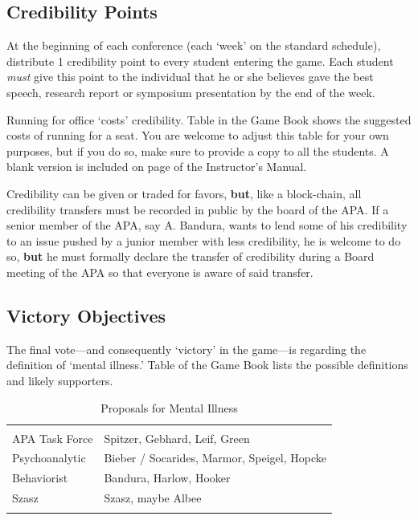 \begin{refsection}
\begin{itemize}
\end{itemize}

\subsection{Credibility Points}
\label{credibilitypoints}

At the beginning of each conference (each ‘week’ on the standard schedule), distribute 1 credibility point to every student entering the game. Each student \emph{must} give this point to the individual that he or she believes gave the best speech, research report or symposium presentation by the end of the week. 

Running for office ‘costs’ credibility. Table  in the Game Book shows the suggested costs of running for a seat. You are welcome to adjust this table for your own purposes, but if you do so, make sure to provide a copy to all the students. A blank version is included on page \pageref{sample: credibilitypointsmenu} of the Instructor's Manual.

Credibility can be given or traded for favors, \textbf{but}, like a block-chain, all credibility transfers must be recorded in public by the board of the APA. If a senior member of the APA, say A. Bandura, wants to lend some of his credibility to an issue pushed by a junior member with less credibility, he is welcome to do so, \textbf{but} he must formally declare the transfer of credibility during a Board meeting of the APA so that everyone is aware of said transfer. 

\subsection{Victory Objectives}
\label{victoryobjectives}

The final vote---and consequently ‘victory’ in the game---is regarding the definition of ‘mental illness.’ Table  of the Game Book lists the possible definitions and likely supporters.

 \begin{longtable}[!t]{ | P{3cm} | P{8cm} |  }
\hline
{}&
\\
APA Task Force&
Spitzer, Gebhard, Leif, Green\\
Psychoanalytic&
Bieber / Socarides, Marmor, Speigel, Hopcke\\
Behaviorist&
Bandura, Harlow, Hooker\\
Szasz&
Szasz, maybe Albee\\ \hline
\caption{Proposals for Mental Illness}
\label{table: mentalillness}
\end{longtable}


\end{refsection}

